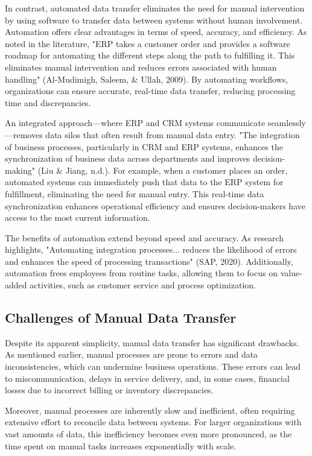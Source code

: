 In contrast, automated data transfer eliminates the need for manual intervention by using software to transfer data between systems without human involvement. Automation offers clear advantages in terms of speed, accuracy, and efficiency. As noted in the literature, "ERP takes a customer order and provides a software roadmap for automating the different steps along the path to fulfilling it. This eliminates manual intervention and reduces errors associated with human handling" (Al-Mudimigh, Saleem, \& Ullah, 2009). By automating workflows, organizations can ensure accurate, real-time data transfer, reducing processing time and discrepancies.

An integrated approach—where ERP and CRM systems communicate seamlessly—removes data silos that often result from manual data entry. "The integration of business processes, particularly in CRM and ERP systems, enhances the synchronization of business data across departments and improves decision-making" (Liu \& Jiang, n.d.). For example, when a customer places an order, automated systems can immediately push that data to the ERP system for fulfillment, eliminating the need for manual entry. This real-time data synchronization enhances operational efficiency and ensures decision-makers have access to the most current information.

The benefits of automation extend beyond speed and accuracy. As research highlights, "Automating integration processes... reduces the likelihood of errors and enhances the speed of processing transactions" (SAP, 2020). Additionally, automation frees employees from routine tasks, allowing them to focus on value-added activities, such as customer service and process optimization.

\subsection{Challenges of Manual Data Transfer}

Despite its apparent simplicity, manual data transfer has significant drawbacks. As mentioned earlier, manual processes are prone to errors and data inconsistencies, which can undermine business operations. These errors can lead to miscommunication, delays in service delivery, and, in some cases, financial losses due to incorrect billing or inventory discrepancies.

Moreover, manual processes are inherently slow and inefficient, often requiring extensive effort to reconcile data between systems. For larger organizations with vast amounts of data, this inefficiency becomes even more pronounced, as the time spent on manual tasks increases exponentially with scale.

